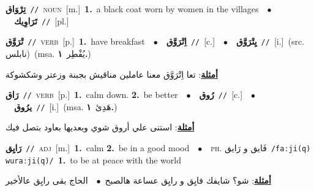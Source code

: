 \documentclass[10pt,a4paper,twoside]{article} %
\begin{document}
\begin{multicols}{2}
{\setlength\topsep{0pt}\textbf{\foreignlanguage{arabic}{تِرْوَاق}}\ {\color{gray}\texttt{//}\color{black}}\ \textsc{noun}\ [m.]\ \textbf{1.}~a black coat worn by women in the villages\ \ $\bullet$\ \ \setlength\topsep{0pt}\textbf{\foreignlanguage{arabic}{تَرَاوِيك}}\ {\color{gray}\texttt{//}\color{black}}\ [pl.]\ } \vspace{2mm}

{\setlength\topsep{0pt}\textbf{\foreignlanguage{arabic}{تْرَوَّق}}\ {\color{gray}\texttt{//}\color{black}}\ \textsc{verb}\ [p.]\ \textbf{1.}~have breakfast\ \ $\bullet$\ \ \setlength\topsep{0pt}\textbf{\foreignlanguage{arabic}{اِتْرَوَّق}}\ {\color{gray}\texttt{//}\color{black}}\ [c.]\ \ $\bullet$\ \ \setlength\topsep{0pt}\textbf{\foreignlanguage{arabic}{يِتْرَوَّق}}\ {\color{gray}\texttt{//}\color{black}}\ [i.]\ (src. \color{gray}\foreignlanguage{arabic}{نابلس}\color{black})\ \color{gray}(msa. \foreignlanguage{arabic}{يُفْطِر}~\foreignlanguage{arabic}{\textbf{١.}})\color{black}\  \begin{flushright}\color{gray}\foreignlanguage{arabic}{\textbf{\underline{\foreignlanguage{arabic}{أمثلة}}}: تعا اِتْرَوَّق معنا عاملين مناقيش بجبنة وزعتر وشكشوكة}\end{flushright}\color{black}} \vspace{2mm}

{\setlength\topsep{0pt}\textbf{\foreignlanguage{arabic}{رَاق}}\ {\color{gray}\texttt{//}\color{black}}\ \textsc{verb}\ [p.]\ \textbf{1.}~calm down.  \textbf{2.}~be better\ \ $\bullet$\ \ \setlength\topsep{0pt}\textbf{\foreignlanguage{arabic}{رُوق}}\ {\color{gray}\texttt{//}\color{black}}\ [c.]\ \ $\bullet$\ \ \setlength\topsep{0pt}\textbf{\foreignlanguage{arabic}{يرُوق}}\ {\color{gray}\texttt{//}\color{black}}\ [i.]\ \color{gray}(msa. \foreignlanguage{arabic}{هَدِئ}~\foreignlanguage{arabic}{\textbf{١.}})\color{black}\  \begin{flushright}\color{gray}\foreignlanguage{arabic}{\textbf{\underline{\foreignlanguage{arabic}{أمثلة}}}: استنى علي أروق شوي وبعديها بعاود بتصل فيك}\end{flushright}\color{black}} \vspace{2mm}

{\setlength\topsep{0pt}\textbf{\foreignlanguage{arabic}{رَايِق}}\ {\color{gray}\texttt{//}\color{black}}\ \textsc{adj}\ [m.]\ \textbf{1.}~calm  \textbf{2.}~be in a good mood\ \ $\bullet$\ \ \textsc{ph.} \color{gray} \foreignlanguage{arabic}{فَايق و رَايق}\color{black}\ {\color{gray}\texttt{/{\sffamily faːji(q) wuraːji(q)}/}\color{black}}\ \textbf{1.}~to be at peace with the world\  \begin{flushright}\color{gray}\foreignlanguage{arabic}{\textbf{\underline{\foreignlanguage{arabic}{أمثلة}}}: شو؟ شايفك فايِق و رايِق عساعة هالصبح\ $\bullet$\ \  الحاج بقى رايِق عالأخير}\end{flushright}\color{black}} \vspace{2mm}


\end{multicols}
\end{document}
